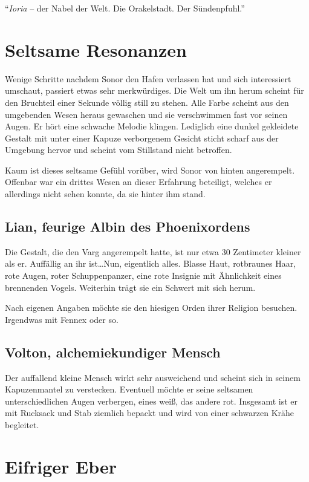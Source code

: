 \begin{center}
\enquote{\emph{Ioria} -- der Nabel der Welt. Die Orakelstadt. Der Sündenpfuhl.}
\end{center}

\section{Seltsame Resonanzen}
Wenige Schritte nachdem Sonor den Hafen verlassen hat und sich interessiert umschaut, passiert etwas sehr merkwürdiges. Die Welt um ihn herum scheint für den Bruchteil einer Sekunde völlig still zu stehen. Alle Farbe scheint aus den umgebenden Wesen heraus gewaschen und sie verschwimmen fast vor seinen Augen. Er hört eine schwache Melodie klingen.
Lediglich eine dunkel gekleidete Gestalt mit unter einer Kapuze verborgenem Gesicht sticht scharf aus der Umgebung hervor und scheint vom Stillstand nicht betroffen.

Kaum ist dieses seltsame Gefühl vorüber, wird Sonor von hinten angerempelt. Offenbar war ein drittes Wesen an dieser Erfahrung beteiligt, welches er allerdings nicht sehen konnte, da sie hinter ihm stand.

\subsection{Lian, feurige Albin des Phoenixordens}
Die Gestalt, die den Varg angerempelt hatte, ist nur etwa 30 Zentimeter kleiner als er. Auffällig an ihr ist\ldots Nun, eigentlich alles. Blasse Haut, rotbraunes Haar, rote Augen, roter Schuppenpanzer, eine rote Insignie mit Ähnlichkeit eines brennenden Vogels. Weiterhin trägt sie ein Schwert mit sich herum.

Nach eigenen Angaben möchte sie den hiesigen Orden ihrer Religion besuchen. Irgendwas mit Fennex oder so. 

\subsection{Volton, alchemiekundiger Mensch}

Der auffallend kleine Mensch wirkt sehr ausweichend und scheint sich in seinem Kapuzenmantel zu verstecken. Eventuell möchte er seine seltsamen unterschiedlichen Augen verbergen, eines weiß, das andere rot. Insgesamt ist er mit Rucksack und Stab ziemlich bepackt und wird von einer schwarzen Krähe begleitet.

\section{Eifriger Eber}

